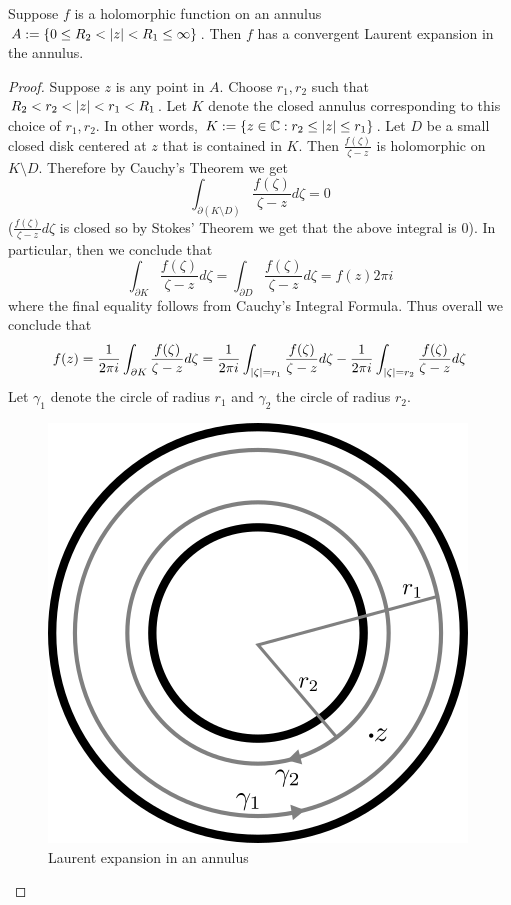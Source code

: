 \begin{proposition}
Suppose $f$ is a holomorphic function on an annulus $A := \{0 \leq R_2 < \left|z\right| < R_1 \leq \infty\}$. Then $f$ has a convergent Laurent expansion in the annulus.
\end{proposition}
\begin{proof}
Suppose $z$ is any point in $A$.
Choose $r_1, r_2$ such that $R_2 < r_2 < \left|z\right| < r_1 < R_1$. Let $K$ denote the closed annulus corresponding to this choice of $r_1, r_2$. In other words, $K := \{z \in \mathbb{C} : r_2 \leq \left|z\right| \leq r_1\}$. Let $D$ be a small closed disk centered at $z$ that is contained in $K$. Then $\frac{f(\zeta)}{\zeta - z}$ is holomorphic on $K \setminus D$. Therefore by Cauchy's Theorem we get
$$ \int_{\partial(K \setminus D)} \frac{f(\zeta)}{\zeta - z} d\zeta = 0$$
($\frac{f(\zeta)}{\zeta - z} d\zeta$ is closed so by Stokes' Theorem we get that the above integral is 0). In particular, then we conclude that
$$ \int_{\partial K} \frac{f(\zeta)}{\zeta - z} d\zeta = \int_{\partial D} \frac{f(\zeta)}{\zeta - z} d\zeta = f(z) 2\pi i $$
where the final equality follows from Cauchy's Integral Formula. Thus overall we conclude that
$$f(z) = \frac{1}{2\pi i} \int_{\partial K} \frac{f(\zeta)}{\zeta - z}d\zeta = \frac{1}{2\pi i} \int_{\left|\zeta\right| = r_1} \frac{f(\zeta)}{\zeta - z} d\zeta - \frac{1}{2\pi i} \int_{\left|\zeta\right| = r_2} \frac{f(\zeta)}{\zeta - z} d\zeta$$
Let $\gamma_1$ denote the circle of radius $r_1$ and $\gamma_2$ the circle of radius $r_2$.

\begin{figure}
    \centering    \includegraphics{Images/laurent_expansion_annulus.png}
    \caption{Laurent expansion in an annulus}
    \label{fig:laurent-expansion-annulus}
\end{figure}


\end{proof}
